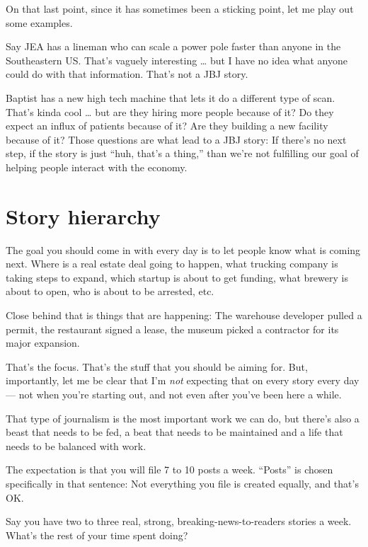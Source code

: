 \documentclass[
  11pt,
  american,
  letterpaperpaper,
  extrafontsizes,onecolumn,openright
  ]{memoir}
\begin{document}
On that last point, since it has sometimes been a sticking point, let me play out some examples.

Say JEA has a lineman who can scale a power pole faster than anyone in the Southeastern US. That's vaguely interesting \ldots{} but I have no idea what anyone could do with that information. That's not a JBJ story.

Baptist has a new high tech machine that lets it do a different type of scan. That's kinda cool \ldots{} but are they hiring more people because of it? Do they expect an influx of patients because of it? Are they building a new facility because of it? Those questions are what lead to a JBJ story: If there's no next step, if the story is just \enquote{huh, that's a thing,} than we're not fulfilling our goal of helping people interact with the economy.

\hypertarget{story-hierarchy}{%
\section*{Story hierarchy}\label{story-hierarchy}}

The goal you should come in with every day is to let people know what is coming next. Where is a real estate deal going to happen, what trucking company is taking steps to expand, which startup is about to get funding, what brewery is about to open, who is about to be arrested, etc.

Close behind that is things that are happening: The warehouse developer pulled a permit, the restaurant signed a lease, the museum picked a contractor for its major expansion.

That's the focus. That's the stuff that you should be aiming for. But, importantly, let me be clear that I'm \emph{not} expecting that on every story every day --- not when you're starting out, and not even after you've been here a while.

That type of journalism is the most important work we can do, but there's also a beast that needs to be fed, a beat that needs to be maintained and a life that needs to be balanced with work.

The expectation is that you will file 7 to 10 posts a week. \enquote{Posts} is chosen specifically in that sentence: Not everything you file is created equally, and that's OK.

Say you have two to three real, strong, breaking-news-to-readers stories a week. What's the rest of your time spent doing?
\end{document}
